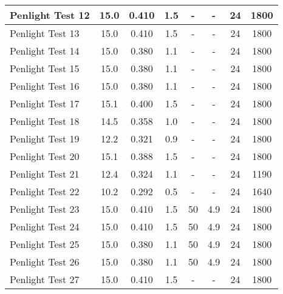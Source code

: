 \begin{table}[!ht]
\begin{center}
\begin{tabular}{|l|c|c|c|c|c|c|c|}
Penlight Test 12  &  15.0      &  0.410        &  1.5        &  -         &  -          &  24           &  1800       \\ \hline
Penlight Test 13  &  15.0      &  0.410        &  1.5        &  -         &  -          &  24           &  1800       \\ \hline
Penlight Test 14  &  15.0      &  0.380        &  1.1        &  -         &  -          &  24           &  1800       \\ \hline
Penlight Test 15  &  15.0      &  0.380        &  1.1        &  -         &  -          &  24           &  1800       \\ \hline
Penlight Test 16  &  15.0      &  0.380        &  1.1        &  -         &  -          &  24           &  1800       \\ \hline
Penlight Test 17  &  15.1      &  0.400        &  1.5        &  -         &  -          &  24           &  1800       \\ \hline
Penlight Test 18  &  14.5      &  0.358        &  1.0        &  -         &  -          &  24           &  1800       \\ \hline
Penlight Test 19  &  12.2      &  0.321        &  0.9        &  -         &  -          &  24           &  1800       \\ \hline
Penlight Test 20  &  15.1      &  0.388        &  1.5        &  -         &  -          &  24           &  1800       \\ \hline
Penlight Test 21  &  12.4      &  0.324        &  1.1        &  -         &  -          &  24           &  1190       \\ \hline
Penlight Test 22  &  10.2      &  0.292        &  0.5        &  -         &  -          &  24           &  1640       \\ \hline
Penlight Test 23  &  15.0      &  0.410        &  1.5        &  50        &  4.9        &  24           &  1800       \\ \hline
Penlight Test 24  &  15.0      &  0.410        &  1.5        &  50        &  4.9        &  24           &  1800       \\ \hline
Penlight Test 25  &  15.0      &  0.380        &  1.1        &  50        &  4.9        &  24           &  1800       \\ \hline
Penlight Test 26  &  15.0      &  0.380        &  1.1        &  50        &  4.9        &  24           &  1800       \\ \hline
Penlight Test 27  &  15.0      &  0.410        &  1.5        &  -         &  -          &  24           &  1800       \\ \hline

\end{tabular}
\end{center}
\end{table}
